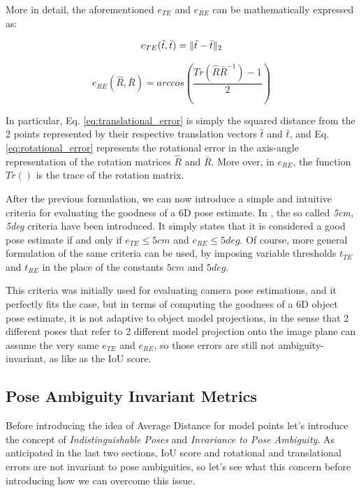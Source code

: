 More in detail, the aforementioned $e_{TE}$ and $e_{RE}$ can be mathematically expressed as:

\begin{equation}
    \label{eq:translational_error}
    e_{TE}(\hat{t}, \bar{t}) = \|{\hat{t} - \bar{t}}\|_2
\end{equation}

\begin{equation}
    \label{eq:rotational_error}
    e_{RE}(\hat{R}, \bar{R}) = arccos(\dfrac{Tr(\hat{R}\bar{R}^{-1}) - 1}{2})
\end{equation}

In particular, Eq. \ref{eq:translational_error} is simply the squared distance from the 2 points represented by their respective translation vectors $\hat{t}$ and $\bar{t}$, and Eq. \ref{eq:rotational_error} represents the rotational error in the axis-angle representation of the rotation matrices $\hat{R}$ and $\bar{R}$. More over, in $e_{RE}$, the function $Tr()$ is the trace of the rotation matrix.

After the previous formulation, we can now introduce a simple and intuitive criteria for evaluating the goodness of a 6D pose estimate. In \cite{shotton2013coordinate}, the so called \emph{5cm, 5deg} criteria have been introduced. It simply states that it is considered a good pose estimate if and only if $e_{TE} \leq 5cm$ and $e_{RE} \leq 5deg$. Of course, more general formulation of the same criteria can be used, by imposing variable thresholds $t_{TE}$ and $t_{RE}$ in the place of the constants $5cm$ and $5deg$.

This criteria was initially used for evaluating camera pose estimations, and it perfectly fits the case, but in terms of computing the goodness of a 6D object pose estimate, it is not adaptive to object model projections, in the sense that 2 different poses that refer to 2 different model projection onto the image plane can assume the very same $e_{TE}$ and $e_{RE}$, so those errors are still not ambiguity-invariant, as like as the IoU score.

\subsection{Pose Ambiguity Invariant Metrics}\label{subsec:pose_ambig_invariant_metrics}
Before introducing the idea of Average Distance for model points let's introduce the concept of \emph{Indistinguishable Poses} and \emph{Invariance to Pose Ambiguity}. As anticipated in the last two sections, IoU score and rotational and translational errors are not invariant to pose ambiguities, so let's see what this concern before introducing how we can overcome this issue.

